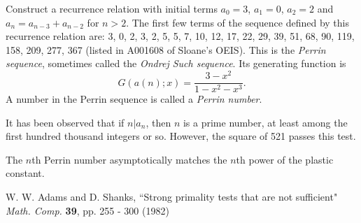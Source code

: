 \documentclass[12pt]{article}
\begin{document}
Construct a recurrence relation with initial terms $a_0 = 3$, $a_1 = 0$, $a_2 = 2$ and $a_n = a_{n - 3} + a_{n - 2}$ for $n > 2$. The first few terms of the sequence defined by this recurrence relation are: 3, 0, 2, 3, 2, 5, 5, 7, 10, 12, 17, 22, 29, 39, 51, 68, 90, 119, 158, 209, 277, 367 (listed in A001608 of Sloane's OEIS). This is the {\em Perrin sequence}, sometimes called the {\em Ondrej Such sequence}. Its generating function is $$G(a(n);x)=\frac{3-x^2}{1-x^2-x^3}.$$ A number in the Perrin sequence is called a \emph{Perrin number}.

It has been observed that if $n|a_n$, then $n$ is a prime number, at least among the first hundred thousand integers or so. However, the square of 521 passes this test.

The $n$th Perrin number asymptotically matches the $n$th power of the plastic constant.

\begin{thebibliography}{1}
 W. W. Adams and D. Shanks, ``Strong primality tests that are not sufficient" {\it Math. Comp.} {\bf 39}, pp. 255 - 300 (1982)
\end{thebibliography}
\end{document}
